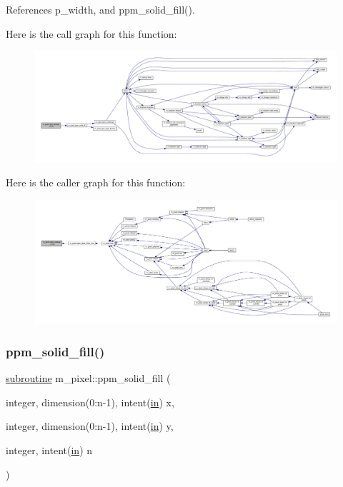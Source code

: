 References p\+\_\+width, and ppm\+\_\+solid\+\_\+fill().

Here is the call graph for this function\+:
\nopagebreak
\begin{figure}[H]
\begin{center}
\leavevmode
\includegraphics[width=350pt]{namespacem__pixel_aede24c612504a3e416840e6242c2d8fb_cgraph}
\end{center}
\end{figure}
Here is the caller graph for this function\+:
\nopagebreak
\begin{figure}[H]
\begin{center}
\leavevmode
\includegraphics[width=350pt]{namespacem__pixel_aede24c612504a3e416840e6242c2d8fb_icgraph}
\end{center}
\end{figure}
\mbox{\label{namespacem__pixel_aedaf33a27e9899da22c2497aff2af903}} 
\subsubsection{\texorpdfstring{ppm\+\_\+solid\+\_\+fill()}{ppm\_solid\_fill()}}
{\footnotesize\ttfamily \hyperlink{M__stopwatch_83_8txt_acfbcff50169d691ff02d4a123ed70482}{subroutine} m\+\_\+pixel\+::ppm\+\_\+solid\+\_\+fill (\begin{DoxyParamCaption}\item[{integer, dimension(0\+:n-\/1), intent(\hyperlink{M__journal_83_8txt_afce72651d1eed785a2132bee863b2f38}{in})}]{x,  }\item[{integer, dimension(0\+:n-\/1), intent(\hyperlink{M__journal_83_8txt_afce72651d1eed785a2132bee863b2f38}{in})}]{y,  }\item[{integer, intent(\hyperlink{M__journal_83_8txt_afce72651d1eed785a2132bee863b2f38}{in})}]{n }\end{DoxyParamCaption})\hspace{0.3cm}{\ttfamily [private]}}



